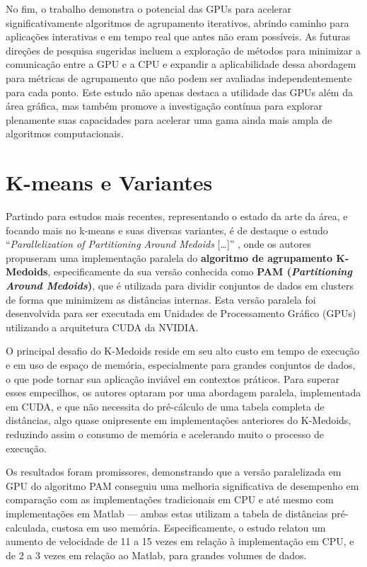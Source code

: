 \documentclass[12pt,
openright, 
oneside, %
a4paper,    %
brazil]{facom-ufu-abntex2}
\begin{document}
No fim, o trabalho demonstra o potencial das GPUs para acelerar significativamente algoritmos de agrupamento iterativos, abrindo caminho para aplicações interativas e em tempo real que antes não eram possíveis. As futuras direções de pesquisa sugeridas incluem a exploração de métodos para minimizar a comunicação entre a GPU e a CPU e expandir a aplicabilidade dessa abordagem para métricas de agrupamento que não podem ser avaliadas independentemente para cada ponto. Este estudo não apenas destaca a utilidade das GPUs além da área gráfica, mas também promove a investigação contínua para explorar plenamente suas capacidades para acelerar uma gama ainda mais ampla de algoritmos computacionais.



\section{K-means e Variantes}

Partindo para estudos mais recentes, representando o estado da arte da área, e focando mais no k-means e suas diversas variantes, é de destaque o estudo \enquote{\textit{Parallelization of Partitioning Around Medoids} [\dots]} \cite{pamKMedoids2020}, onde os autores propuseram uma implementação paralela do \textbf{algoritmo de agrupamento K-Medoids}, especificamente da sua versão conhecida como \textbf{PAM (\textit{Partitioning Around Medoids})}, que é utilizada para dividir conjuntos de dados em clusters de forma que minimizem as distâncias internas. Esta versão paralela foi desenvolvida para ser executada em Unidades de Processamento Gráfico (GPUs) utilizando a arquitetura CUDA da NVIDIA.

O principal desafio do K-Medoids reside em seu alto custo em tempo de execução e em uso de espaço de memória, especialmente para grandes conjuntos de dados, o que pode tornar sua aplicação inviável em contextos práticos. Para superar esses empecilhos, os autores optaram por uma abordagem paralela, implementada em CUDA, e que não necessita do pré-cálculo de uma tabela completa de distâncias, algo quase onipresente em implementações anteriores do K-Medoids, reduzindo assim o consumo de memória e acelerando muito o processo de execução.

Os resultados foram promissores, demonstrando que a versão paralelizada em GPU do algoritmo PAM conseguiu uma melhoria significativa de desempenho em comparação com as implementações tradicionais em CPU e até mesmo com implementações em Matlab --- ambas estas utilizam a tabela de distâncias pré-calculada, custosa em uso memória. Especificamente, o estudo relatou um aumento de velocidade de 11 a 15 vezes em relação à implementação em CPU, e de 2 a 3 vezes em relação ao Matlab, para grandes volumes de dados.
\end{document}
